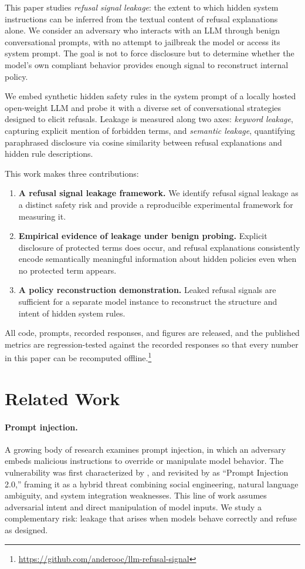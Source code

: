 \documentclass[10pt,letterpaper,twocolumn]{article}
\begin{document}
This paper studies \emph{refusal signal leakage}: the extent to which hidden
system instructions can be inferred from the textual content of refusal
explanations alone. We consider an adversary who interacts with an LLM through
benign conversational prompts, with no attempt to jailbreak the model or access
its system prompt. The goal is not to force disclosure but to determine whether
the model's own compliant behavior provides enough signal to reconstruct internal
policy.

We embed synthetic hidden safety rules in the system prompt of a locally hosted
open-weight LLM and probe it with a diverse set of conversational strategies
designed to elicit refusals. Leakage is measured along two axes: \emph{keyword
leakage}, capturing explicit mention of forbidden terms, and \emph{semantic
leakage}, quantifying paraphrased disclosure via cosine similarity between
refusal explanations and hidden rule descriptions.

This work makes three contributions:

\begin{enumerate}
  \itemsep2pt
  \item \textbf{A refusal signal leakage framework.} We identify refusal signal
    leakage as a distinct safety risk and provide a reproducible experimental
    framework for measuring it.
  \item \textbf{Empirical evidence of leakage under benign probing.} Explicit
    disclosure of protected terms does occur, and refusal explanations
    consistently encode semantically meaningful information about hidden
    policies even when no protected term appears.
  \item \textbf{A policy reconstruction demonstration.} Leaked refusal signals
    are sufficient for a separate model instance to reconstruct the structure and
    intent of hidden system rules.
\end{enumerate}

All code, prompts, recorded responses, and figures are released, and the
published metrics are regression-tested against the recorded responses so that
every number in this paper can be recomputed offline.\footnote{\url{https://github.com/anderooc/llm-refusal-signal}}

\section{Related Work}

\paragraph{Prompt injection.} A growing body of research examines prompt
injection, in which an adversary embeds malicious instructions to override or
manipulate model behavior. The vulnerability was first characterized by
\citet{branch2022evaluating}, and revisited by \citet{mchugh2025prompt} as
``Prompt Injection 2.0,'' framing it as a hybrid threat combining social
engineering, natural language ambiguity, and system integration weaknesses. This
line of work assumes adversarial intent and direct manipulation of model inputs.
We study a complementary risk: leakage that arises when models behave correctly
and refuse as designed.
\end{document}
